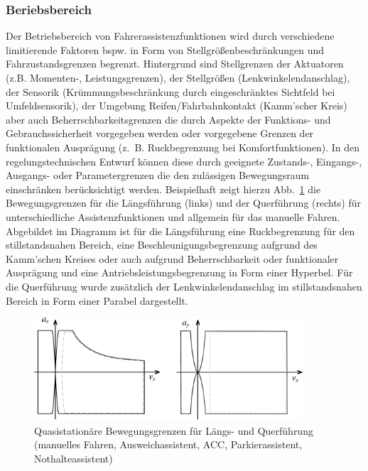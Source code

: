 \subsubsection*{Beriebsbereich}
Der Betriebsbereich von Fahrerassistenzfunktionen wird durch verschiedene limitierende Faktoren bspw. in Form von Stellgrößenbeschränkungen und Fahrzustandsgrenzen begrenzt. 
Hintergrund sind Stellgrenzen der Aktuatoren (z.B. Momenten-, Leistungsgrenzen), der Stellgrößen (Lenkwinkelendanschlag), der Sensorik (Krümmungsbeschränkung durch eingeschränktes Sichtfeld bei Umfeldsensorik), der Umgebung Reifen/Fahrbahnkontakt (Kamm'scher Kreis) aber auch Beherrschbarkeitsgrenzen die durch Aspekte der Funktions- und Gebrauchssicherheit vorgegeben werden oder vorgegebene Grenzen der funktionalen Ausprägung (z.~B. Ruckbegrenzung bei Komfortfunktionen). In den regelungstechnischen Entwurf können diese durch geeignete Zustands-, Eingangs-, Ausgangs- oder Parametergrenzen die den zulässigen Bewegungsraum einschränken berücksichtigt werden.
Beispielhaft zeigt hierzu Abb.~\ref{fig:bew_lims} die Bewegungsgrenzen für die Längsführung (links) und der Querführung (rechts) für unterschiedliche Assistenzfunktionen und allgemein für das manuelle Fahren. Abgebildet im Diagramm ist für die Längsführung eine Ruckbegrenzung für den stillstandsnahen Bereich, eine Beschleunigungsbegrenzung aufgrund des Kamm'schen Kreises oder auch aufgrund Beherrschbarkeit oder funktionaler Ausprägung und eine Antriebsleistungsbegrenzung in Form einer Hyperbel. Für die Querführung wurde zusätzlich der Lenkwinkelendanschlag im stillstandsnahen Bereich in Form einer Parabel dargestellt.
  
\begin{figure}[htp!]
  \centering
    \includegraphics[width=10cm]{Bilder/01/betriebsbereich.eps}
    \caption{Quasistationäre Bewegungsgrenzen für Längs- und Querführung (manuelles Fahren, Ausweichassistent, ACC, Parkierassistent, Nothalteassistent)}
    \label{fig:bew_lims}
\end{figure}

